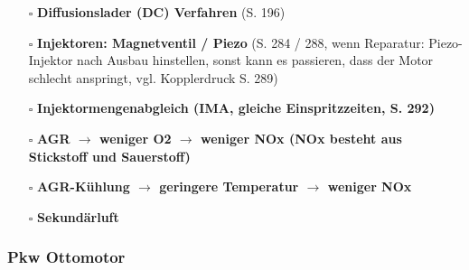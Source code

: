 \documentclass{vorlage-design-main}
\begin{document}
\begin{itemize}
\item[$\square$]
  \textbf{Diffusionslader (DC) Verfahren} (S. 196)
\item[$\square$]
  \textbf{Injektoren: Magnetventil / Piezo} (S. 284 / 288, wenn
  Reparatur: Piezo-Injektor nach Ausbau hinstellen, sonst kann es
  passieren, dass der Motor schlecht anspringt, vgl. Kopplerdruck S.
  289)
\item[$\square$]
  \textbf{Injektormengenabgleich (IMA, gleiche Einspritzzeiten, S. 292)}
\item[$\square$]
  \textbf{AGR $\to$ weniger O2 $\to$ weniger NOx (NOx besteht aus
  Stickstoff und Sauerstoff)}
\item[$\square$]
  \textbf{AGR-Kühlung $\to$ geringere Temperatur $\to$ weniger NOx}
\item[$\square$]
  \textbf{Sekundärluft}
\end{itemize}

\subsubsection{Pkw Ottomotor}\label{pkw-ottomotor}
\end{document}
